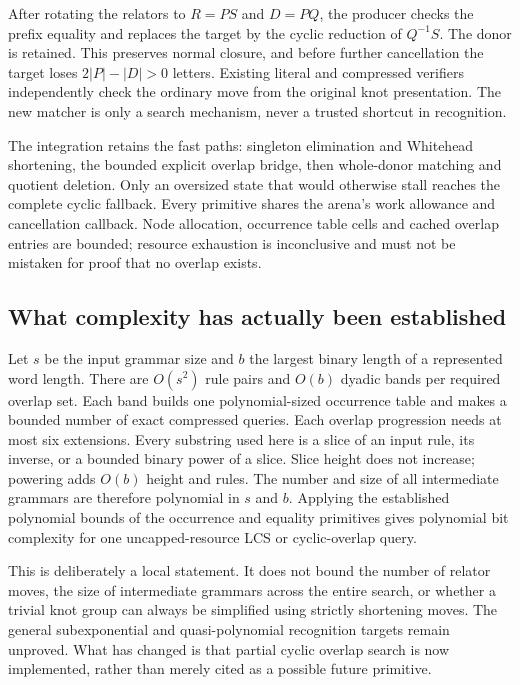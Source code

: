After rotating the relators to $R=PS$ and $D=PQ$, the producer checks the
prefix equality and replaces the target by the cyclic reduction of
$Q^{-1}S$. The donor is retained. This preserves normal closure, and
before further cancellation the target loses $2|P|-|D|>0$ letters.
Existing literal and compressed verifiers independently check the ordinary
 move from the original knot presentation. The new matcher
is only a search mechanism, never a trusted shortcut in recognition.

The integration retains the fast paths: singleton elimination and
Whitehead shortening, the bounded explicit overlap bridge, then whole-donor
matching and quotient deletion. Only an oversized state that would otherwise
stall reaches the complete cyclic fallback. Every primitive shares the
arena's work allowance and cancellation callback. Node allocation, occurrence
table cells and cached overlap entries are bounded; resource exhaustion is
inconclusive and must not be mistaken for proof that no overlap exists.

\subsection{What complexity has actually been established}

Let $s$ be the input grammar size and $b$ the largest binary length of a
represented word length. There are $O(s^2)$ rule pairs and $O(b)$ dyadic
bands per required overlap set. Each band builds one polynomial-sized
occurrence table and makes a bounded number of exact compressed queries.
Each overlap progression needs at most six extensions. Every substring
used here is a slice of an input rule, its inverse, or a bounded binary
power of a slice. Slice height does not increase; powering adds $O(b)$
height and rules. The number and size of all intermediate grammars are
therefore polynomial in $s$ and $b$. Applying the established polynomial
bounds of the occurrence and equality primitives gives polynomial bit
complexity for one uncapped-resource LCS or cyclic-overlap query.

This is deliberately a local statement. It does not bound the number of
relator moves, the size of intermediate grammars across the entire search,
or whether a trivial knot group can always be simplified using strictly
shortening moves. The general subexponential and quasi-polynomial recognition
targets remain unproved. What has changed is that partial cyclic overlap
search is now implemented, rather than merely cited as a possible future
primitive.

